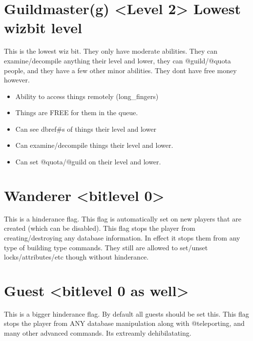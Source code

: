 \documentclass[letterpaper,10pt,english]{sphinxmanual}
\begin{document}
\section{Guildmaster(g) \textless{}Level 2\textgreater{} \sphinxhyphen{} Lowest wizbit level}
\label{\detokenize{bitlevels:guildmaster-g-level-2-lowest-wizbit-level}}
\sphinxAtStartPar
This is the lowest wiz bit.  They only have moderate abilities.
They can examine/decompile anything their level and lower, they can
@guild/@quota people, and they have a few other minor abilities.
They don\textquotesingle{}t have free money however.
\begin{itemize}
\item {} 
\sphinxAtStartPar
Ability to access things remotely (long\_fingers)

\item {} 
\sphinxAtStartPar
Things are FREE for them in the queue.

\item {} 
\sphinxAtStartPar
Can see dbref\#\textquotesingle{}s of things their level and lower

\item {} 
\sphinxAtStartPar
Can examine/decompile things their level and lower.

\item {} 
\sphinxAtStartPar
Can set @quota/@guild on their level and lower.

\end{itemize}


\section{Wanderer \textless{}bitlevel 0\textgreater{}}
\label{\detokenize{bitlevels:wanderer-bitlevel-0}}
\sphinxAtStartPar
This is a hinderance flag.  This flag is automatically set on new
players that are created (which can be disabled).  This flag stops
the player from creating/destroying any database information.   In
effect it stops them from any type of building type commands.  They
still are allowed to set/unset locks/attributes/etc though without
hinderance.


\section{Guest \textless{}bitlevel 0 as well\textgreater{}}
\label{\detokenize{bitlevels:guest-bitlevel-0-as-well}}
\sphinxAtStartPar
This is a bigger hinderance flag.  By default all guests should be
set this.  This flag stops the player from ANY database manipulation
along with @teleporting, and many other advanced commands.  It\textquotesingle{}s
extreamly dehibilatating.
\end{document}
